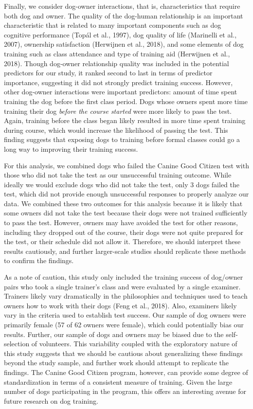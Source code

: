 \documentclass[
  english,
  ,pub,floatsintext]{apa6}
\begin{document}
Finally, we consider dog-owner interactions, that is, characteristics that require both dog and owner. The quality of the dog-human relationship is an important characteristic that is related to many important components such as dog cognitive performance (Topál et al., 1997), dog quality of life (Marinelli et al., 2007), ownership satisfaction (Herwijnen et al., 2018), and some elements of dog training such as class attendance and type of training aid (Herwijnen et al., 2018). Though dog-owner relationship quality was included in the potential predictors for our study, it ranked second to last in terms of predictor importance, suggesting it did not strongly predict training success. However, other dog-owner interactions were important predictors: amount of time spent training the dog before the first class period. Dogs whose owners spent more time training their dog \emph{before the course started} were more likely to pass the test. Again, training before the class began likely resulted in more time spent training during course, which would increase the likelihood of passing the test. This finding suggests that exposing dogs to training before formal classes could go a long way to improving their training success.

For this analysis, we combined dogs who failed the Canine Good Citizen test with those who did not take the test as our unsuccessful training outcome. While ideally we would exclude dogs who did not take the test, only 3 dogs failed the test, which did not provide enough unsuccessful responses to properly analyze our data. We combined these two outcomes for this analysis because it is likely that some owners did not take the test because their dogs were not trained sufficiently to pass the test. However, owners may have avoided the test for other reasons, including they dropped out of the course, their dogs were not quite prepared for the test, or their schedule did not allow it. Therefore, we should interpret these results cautiously, and further larger-scale studies should replicate these methods to confirm the findings.

As a note of caution, this study only included the training success of dog/owner pairs who took a single trainer's class and were evaluated by a single examiner. Trainers likely vary dramatically in the philosophies and techniques used to teach owners how to work with their dogs (Feng et al., 2018). Also, examiners likely vary in the criteria used to establish test success. Our sample of dog owners were primarily female (57 of 62 owners were female), which could potentially bias our results. Further, our sample of dogs and owners may be biased due to the self-selection of volunteers. This variability coupled with the exploratory nature of this study suggests that we should be cautious about generalizing these findings beyond the study sample, and further work should attempt to replicate the findings. The Canine Good Citizen program, however, can provide some degree of standardization in terms of a consistent measure of training. Given the large number of dogs participating in the program, this offers an interesting avenue for future research on dog training.
\end{document}
